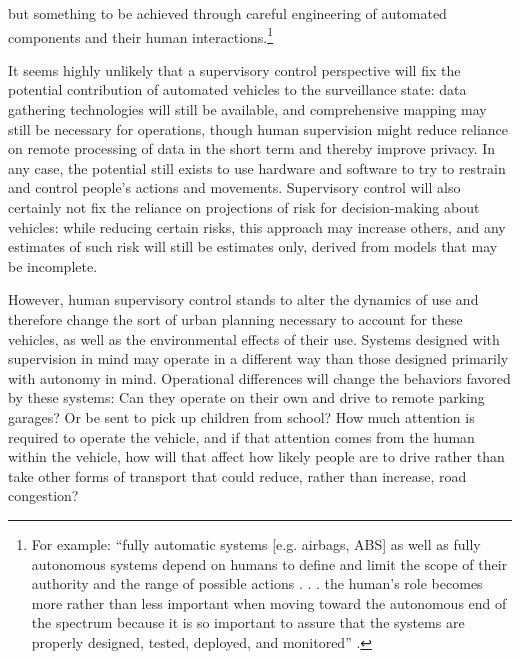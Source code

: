 but something to be  
achieved through careful engineering of automated components and their
human interactions.\footnote{For example:
``fully
automatic systems [e.g. airbags, ABS] as well as fully
autonomous systems depend on humans to define and limit the scope of
their authority and the range of possible actions . . . the human's role
becomes more rather than less important when moving toward the
autonomous end of the spectrum
because it is so important to assure that the systems are
properly designed, tested, deployed, and monitored'' \cite[p. 14-15]{NRCAutonomy}.}

It seems highly unlikely that a supervisory control perspective will
fix the potential contribution of automated vehicles to the
surveillance state:  data gathering technologies will still be
available, and comprehensive mapping may still be necessary for
operations, though human supervision might reduce
reliance on remote processing of data in the short term and thereby
improve privacy. In 
any case, the potential still exists to use hardware 
and software to try to restrain and control people's actions and
movements. Supervisory control will also certainly not fix the
reliance on projections of risk for decision-making about vehicles:
while reducing certain risks, this approach may increase others, and
any estimates of such risk will still be estimates only, derived from
models that may be incomplete.


However, human supervisory control stands to alter the dynamics of use
and therefore change the sort of urban planning necessary to account
for these vehicles, as well as the environmental effects of their use.
Systems designed with supervision in mind may operate in a different
way than those designed primarily with autonomy in mind. Operational
differences will change the behaviors favored by these systems:  Can
they operate on their own and drive to remote parking garages? Or be
sent to pick up children from school? How much attention is required
to operate the vehicle, and if that attention comes from the human
within the vehicle, how will that affect how likely people are to
drive rather than take other forms of transport that could reduce,
rather than increase, road congestion? 


